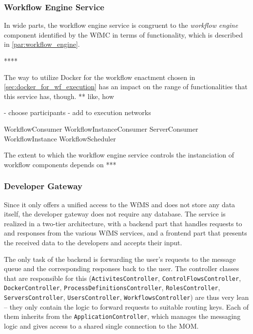   \subsubsection{Workflow Engine Service} %
    \label{subs:workflow_engine_service}
    In wide parts, the workflow engine service is congruent to the \emph{workflow engine} component identified by the \ac{WfMC} in terms of functionality, which is described in \ref{par:workflow_engine}.


    ****

    The way to utilize Docker for the workflow enactment chosen in \ref{sec:docker_for_wf_execution} has an impact on the range of functionalities that this service has, though. ** like, how

    - choose participants
    - add to execution networks

    WorkflowConsumer
    WorkflowInstanceConsumer
    ServerConsumer
    WorkflowInstance
    WorkflowScheduler


    The extent to which the workflow engine service controls the instanciation of workflow components depends on ***

  \subsubsection{Developer Gateway} %
    \label{subs:developer_gateway}
    Since it only offers a unified access to the \ac{WfMS} and does not store any data itself, the developer gateway does not require any database. The service is realized in a two-tier architecture, with a backend part that handles requests to and responses from the various \ac{WfMS} services, and a frontend part that presents the received data to the developers and accepts their input.

    The only task of the backend is forwarding the user's requests to the message queue and the corresponding responses back to the user. The controller classes that are responsible for this (\texttt{ActivitesController}, \texttt{ControlFlowsController}, \texttt{DockerController}, \texttt{ProcessDefinitionsController}, \texttt{RolesController}, \texttt{ServersController}, \texttt{UsersController}, \texttt{WorkflowsController}) are thus very lean -- they only contain the logic to forward requests to suitable routing keys. Each of them inherits from the \texttt{ApplicationController}, which manages the messaging logic and gives access to a shared single connection to the \ac{MOM}.

